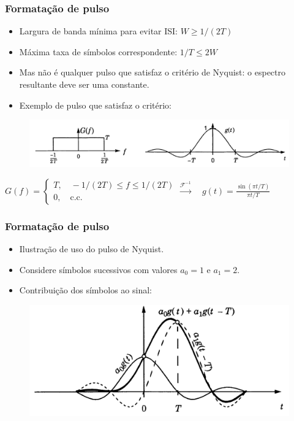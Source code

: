 \begin{frame}
	\frametitle{Formatação de pulso}

	\begin{itemize}
	    \item Largura de banda mínima para evitar ISI: $W \geq 1/(2T)$
	    \item Máxima taxa de símbolos correspondente: $1/T \leq 2W$
	    \item Mas não é qualquer pulso que satisfaz o critério de Nyquist: o espectro resultante deve ser uma constante.
	    \item Exemplo de pulso que satisfaz o critério:
	\end{itemize}			
	\begin{figure}[t]	
	  \begin{center}
	    \includegraphics[width=\columnwidth]{figs/pam_04}
	  \end{center}
	\end{figure}
	\small
	$G(f) = \begin{cases}
		    T , \quad -1/(2T) \leq f \leq 1/(2T) \\
		    0, \quad \text{c.c.}
		\end{cases}  \xrightarrow{\mathcal{F}^{-1}} \quad g(t) = \frac{\sin(\pi t/T)}{\pi t/T}$

\end{frame}


\begin{frame}
	\frametitle{Formatação de pulso}

	\begin{itemize}
	    \item Ilustração de uso do pulso de Nyquist.
	    \item Considere símbolos sucessivos com valores $a_0=1$ e $a_1=2$.
	    \item Contribuição dos símbolos ao sinal:
	\end{itemize}			
	\begin{figure}[t]	
	  \begin{center}
	    \includegraphics[width=0.7\columnwidth]{figs/pam_05}
	  \end{center}
	\end{figure}
\end{frame}


